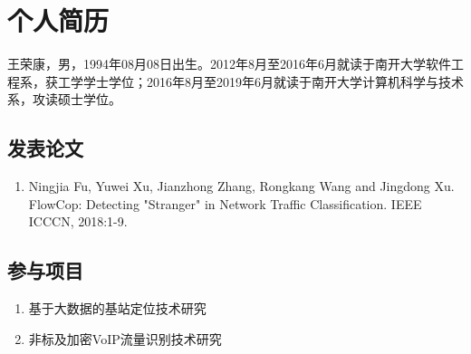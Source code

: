 

\chapter*{个人简历}
王荣康，男，1994年08月08日出生。2012年8月至2016年6月就读于南开大学软件工程系，获工学学士学位；2016年8月至2019年6月就读于南开大学计算机科学与技术系，攻读硕士学位。
\section*{发表论文}
\begin{enumerate}
\renewcommand{\labelenumi}{[\theenumi]}
\item Ningjia Fu, Yuwei Xu, Jianzhong Zhang, Rongkang Wang and Jingdong Xu. FlowCop: Detecting "Stranger" in Network Traffic Classification. IEEE ICCCN, 2018:1-9.

\end{enumerate}
\section*{参与项目}
\begin{enumerate}
\renewcommand{\labelenumi}{[\theenumi]}
\item 基于大数据的基站定位技术研究
\item 非标及加密VoIP流量识别技术研究
\end{enumerate}